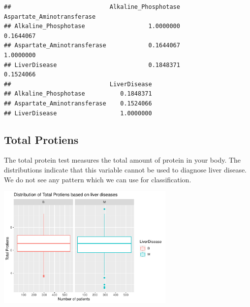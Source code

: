 \documentclass[]{article}
\newenvironment{Shaded}{\begin{snugshade}}{\end{snugshade}}
\newcommand{\CommentTok}[1]{\textcolor[rgb]{0.56,0.35,0.01}{\textit{#1}}}
\newcommand{\DataTypeTok}[1]{\textcolor[rgb]{0.13,0.29,0.53}{#1}}
\newcommand{\KeywordTok}[1]{\textcolor[rgb]{0.13,0.29,0.53}{\textbf{#1}}}
\newcommand{\NormalTok}[1]{#1}
\newcommand{\OperatorTok}[1]{\textcolor[rgb]{0.81,0.36,0.00}{\textbf{#1}}}
\newcommand{\StringTok}[1]{\textcolor[rgb]{0.31,0.60,0.02}{#1}}
\begin{document}
\begin{verbatim}
##                            Alkaline_Phosphotase Aspartate_Aminotransferase
## Alkaline_Phosphotase                  1.0000000                  0.1644067
## Aspartate_Aminotransferase            0.1644067                  1.0000000
## LiverDisease                          0.1848371                  0.1524066
##                            LiverDisease
## Alkaline_Phosphotase          0.1848371
## Aspartate_Aminotransferase    0.1524066
## LiverDisease                  1.0000000
\end{verbatim}

\subsection{Total Protiens}

The total protein test measures the total amount of protein in your
body. The distributions indicate that this variable cannot be used to
diagnose liver disease. We do not see any pattern which we can use for
classification.

\begin{Shaded}
\end{Shaded}

\begin{center}
\includegraphics[width=0.65\textwidth]{LiverDisease_files/figure-latex/unnamed-chunk-21-1.pdf}
\end{center}
\end{document}

